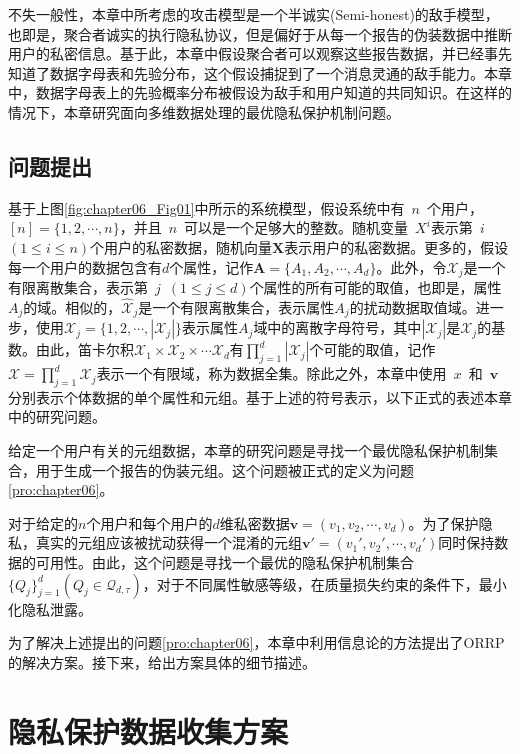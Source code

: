 不失一般性，本章中所考虑的攻击模型是一个半诚实(Semi-honest)的敌手模型，也即是，聚合者诚实的执行隐私协议，但是偏好于从每一个报告的伪装数据中推断用户的私密信息。基于此，本章中假设聚合者可以观察这些报告数据，并已经事先知道了数据字母表和先验分布，这个假设捕捉到了一个消息灵通的敌手能力。本章中，数据字母表上的先验概率分布被假设为敌手和用户知道的共同知识。在这样的情况下，本章研究面向多维数据处理的最优隐私保护机制问题。

\subsection{问题提出}\label{sec:chapter06_problem_statement}
基于上图\ref{fig:chapter06_Fig01}中所示的系统模型，假设系统中有~$n$~个用户，$[n]=\{1,2,\cdots,n\}$，并且~$n$~可以是一个足够大的整数。随机变量~$X^i$表示第~$i$~$(1\leq i \leq n)$个用户的私密数据，随机向量$\bm{X}$表示用户的私密数据。更多的，假设每一个用户的数据包含有$d$个属性，记作$\bm{A}=\{A_1,A_2,\cdots,A_d\}$。此外，令$\mathcal{X}_j$是一个有限离散集合，表示第~$j$~$(1 \leq j \leq d)$个属性的所有可能的取值，也即是，属性$A_j$的域。相似的，$\hat{\mathcal{X}}_j$是一个有限离散集合，表示属性$A_j$的扰动数据取值域。进一步，使用$\mathcal{X}_j=\{1,2,\cdots,|\mathcal{X}_j|\}$表示属性$A_j$域中的离散字母符号，其中$|\mathcal{X}_j|$是$\mathcal{X}_j$的基数。由此，笛卡尔积$\mathcal{X}_1\times \mathcal{X}_2\times \cdots \mathcal{X}_d$有$\prod_{j=1}^{d}|\mathcal{X}_j|$个可能的取值，记作$\mathcal{X}=\prod_{j=1}^{d}\mathcal{X}_j$表示一个有限域，称为数据全集。除此之外，本章中使用~$x$~和~$\bm{v}~$分别表示个体数据的单个属性和元组。基于上述的符号表示，以下正式的表述本章中的研究问题。


给定一个用户有关的元组数据，本章的研究问题是寻找一个最优隐私保护机制集合，用于生成一个报告的伪装元组。这个问题被正式的定义为问题\ref{pro:chapter06}。

\begin{problem}\label{pro:chapter06}
对于给定的$n$个用户和每个用户的$d$维私密数据$\bm{v}=(v_1,v_2,\cdots,v_d)$。为了保护隐私，真实的元组应该被扰动获得一个混淆的元组$\bm{v}'=(v_1',v_2',\cdots,v_d')$同时保持数据的可用性。由此，这个问题是寻找一个最优的隐私保护机制集合$\{Q_j\}_{j=1}^d(Q_j \in \mathcal{Q}_{d,\tau})$，对于不同属性敏感等级，在质量损失约束的条件下，最小化隐私泄露。
\end{problem}

为了解决上述提出的问题\ref{pro:chapter06}，本章中利用信息论的方法提出了ORRP的解决方案。接下来，给出方案具体的细节描述。

\section{隐私保护数据收集方案}\label{sec:chapter06_our_scheme}


